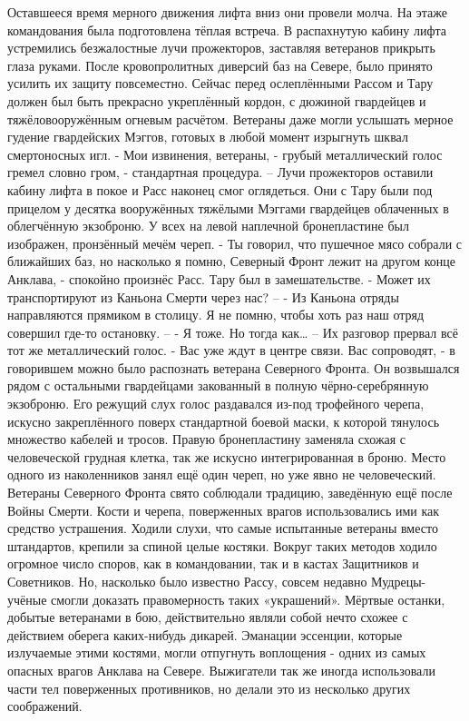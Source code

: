 \documentclass[a4paper, 12pt]{report}
\begin{document}
Оставшееся время мерного движения лифта вниз они провели молча.
На этаже командования была подготовлена тёплая встреча. В распахнутую кабину лифта устремились безжалостные лучи прожекторов, заставляя ветеранов прикрыть глаза руками. 
После кровопролитных диверсий баз на Севере, было принято усилить их защиту повсеместно. Сейчас перед ослеплёнными Рассом и Тару должен был быть прекрасно укреплённый кордон, с дюжиной гвардейцев и тяжёловооружённым огневым расчётом. Ветераны даже могли услышать мерное гудение гвардейских Мэггов, готовых в любой момент изрыгнуть шквал смертоносных игл.
- Мои извинения, ветераны, - грубый металлический голос гремел словно гром, - стандартная процедура. –
 	Лучи прожекторов оставили кабину лифта в покое и Расс наконец смог оглядеться. Они с Тару были под прицелом у десятка вооружённых тяжёлыми Мэггами гвардейцев облаченных в облегчённую экзоброню. У всех на левой наплечной бронепластине был изображен, пронзённый мечём череп. 
	- Ты говорил, что пушечное мясо собрали с ближайших баз, но насколько я помню, Северный Фронт лежит на другом конце Анклава, - спокойно произнёс Расс. Тару был в замешательстве.
	- Может их транспортируют из Каньона Смерти через нас? – 
	- Из Каньона отряды направляются прямиком в столицу. Я не помню, чтобы хоть раз наш отряд совершил где-то остановку. – 
	- Я тоже. Но тогда как… –
	Их разговор прервал всё тот же металлический голос.
	- Вас уже ждут в центре связи. Вас сопроводят, - в говорившем можно было распознать ветерана Северного Фронта. Он возвышался рядом с остальными гвардейцами закованный в полную чёрно-серебрянную экзоброню. Его режущий слух голос раздавался из-под трофейного черепа, искусно закреплённого поверх стандартной боевой маски, к которой тянулось множество кабелей и тросов. Правую бронепластину заменяла схожая с человеческой грудная клетка, так же искусно интегрированная в броню. Место одного из наколенников занял ещё один череп, но уже явно не человеческий. 
Ветераны Северного Фронта свято соблюдали традицию, заведённую ещё после Войны Смерти. Кости и черепа, поверженных врагов использовались ими как средство устрашения. Ходили слухи, что самые испытанные ветераны вместо штандартов, крепили за спиной целые костяки. Вокруг таких методов ходило огромное число споров, как в командовании, так и в кастах Защитников и Советников. Но, насколько было известно Рассу, совсем недавно Мудрецы-учёные смогли доказать правомерность таких «украшений». Мёртвые останки, добытые ветеранами в бою, действительно являли собой нечто схожее с действием оберега каких-нибудь дикарей. Эманации эссенции, которые излучаемые этими костями, могли отпугнуть воплощения - одних из самых опасных врагов Анклава на Севере. Выжигатели так же иногда использовали части тел поверженных противников, но делали это из несколько других соображений.
\end{document}
